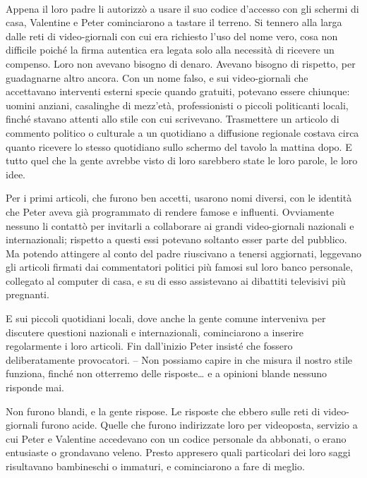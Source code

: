{~}

{Appena il loro padre li autorizzò a usare il suo codice d'accesso con
	gli schermi di casa, Valentine e Peter cominciarono a tastare il
	terreno. Si tennero alla larga dalle reti di video-giornali con cui era
	richiesto l'uso del nome vero, cosa non difficile poiché la firma
	autentica era legata solo alla necessità di ricevere un compenso. Loro
	non avevano bisogno di denaro. Avevano bisogno di rispetto, per
	guadagnarne altro ancora. Con un nome falso, e sui video-giornali che
	accettavano interventi esterni specie quando gratuiti, potevano essere
	chiunque: uomini anziani, casalinghe di mezz'età, professionisti o
	piccoli politicanti locali, finché stavano attenti allo stile con cui
	scrivevano. Trasmettere un articolo di commento politico o culturale a
	un quotidiano a diffusione regionale costava circa quanto ricevere lo
	stesso quotidiano sullo schermo del tavolo la mattina dopo. E tutto quel
	che la gente avrebbe visto di loro sarebbero state le loro parole, le
	loro idee.}

{Per i primi articoli, che furono ben accetti, usarono nomi diversi, con
	le identità che Peter aveva già programmato di rendere famose e
	influenti. Ovviamente nessuno li contattò per invitarli a collaborare ai
	grandi video-giornali nazionali e internazionali; rispetto a questi essi
	potevano soltanto esser parte del pubblico. Ma potendo attingere al
	conto del padre riuscivano a tenersi aggiornati, leggevano gli articoli
	firmati dai commentatori politici più famosi sul loro banco personale,
	collegato al computer di casa, e su di esso assistevano ai dibattiti
	televisivi più pregnanti.}

{E sui piccoli quotidiani locali, dove anche la gente comune interveniva
	per discutere questioni nazionali e internazionali, cominciarono a
	inserire regolarmente i loro articoli. Fin dall'inizio Peter insisté che
	fossero deliberatamente provocatori. -- Non possiamo capire in che
	misura il nostro stile funziona, finché non otterremo delle
	risposte\ldots{} e a opinioni blande nessuno risponde mai.}

{Non furono blandi, e la gente rispose. Le risposte che ebbero sulle
	reti di video-giornali furono acide. Quelle che furono indirizzate loro
	per videoposta, servizio a cui Peter e Valentine accedevano con un
	codice personale da abbonati, o erano entusiaste o grondavano veleno.
	Presto appresero quali particolari dei loro saggi risultavano
	bambineschi o immaturi, e cominciarono a fare di meglio.}


